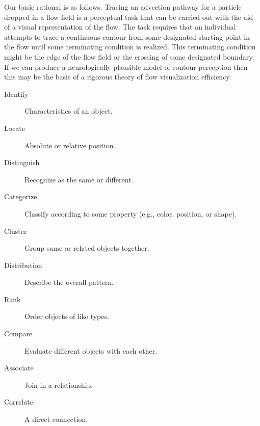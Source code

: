 \documentclass[prodmode,acmtap]{acmlarge}
\begin{document}
Our basic rational is as follows. Tracing an advection pathway for a
particle dropped in a flow field is a perceptual task that can be
carried out with the aid of a visual representation of the flow.
The task requires that an individual attempts to trace a continuous
contour from some designated starting point in the flow until some
terminating condition is realized. This terminating condition might
be the edge of the flow field or the crossing of some designated
boundary. If we can produce a neurologically plausible model of
contour perception then this may be the basis of a rigorous theory of
flow visualization efficiency.
\begin{description}
    \item[Identify] Characteristics of an object.
    \item[Locate] Absolute or relative position.
    \item[Distinguish] Recognize as the same or different.
    \item[Categorize] Classify according to some property (e.g.,  color, position, or shape).
    \item[Cluster] Group same or related objects together.
    \item[Distribution] Describe the overall pattern.
    \item[Rank] Order objects of like types.
    \item[Compare] Evaluate different objects with each other.
    \item[Associate] Join in a relationship.
    \item[Correlate] A direct connection.
\end{description}
\end{document}
